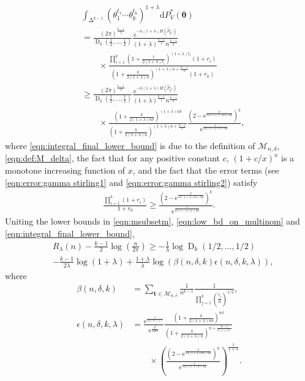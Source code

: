 \documentclass[journal, 10pt]{IEEEtran}
\newcommand{\rmd}{\mathrm{d}}
\newcommand{\rme}{\mathrm{e}}
\newcommand{\cM}{\mathcal{M}}
\theoremstyle{plain}
\theoremstyle{plain}
\theoremstyle{plain}
\theoremstyle{plain}
\newcommand{\boldtheta}{\mathbold{\theta}}
\newcommand{\boldt}{\mathbold{t}}
\newcommand{\opD}{\operatorname{D}}
\newcommand{\simplex}{\operatorname{\Delta}}
\begin{document}
\begin{align}
&\int_{\simplex^{k-1}}\left(\theta_1^{t_1}\cdots\theta_k^{t_k}\right)^{1+\lambda}\rmd P^*_{V}(\boldtheta) \nonumber \\
&=\frac{(2\pi)^{\frac{k-1}{2}}}{\opD_k(\frac12, \hdots, \frac12)} 
\frac{\rme^{-n(1+\lambda)H(\widehat{P}_{y ^n})}}{(1+\lambda)^{\frac{k-1}{2}}n^{\frac{k-1}{2}}}  \label{eqn:integral_term_by_term} \\
&\qquad  \times \frac{\prod_{i=1}^k\left(1+\frac{1}{2(1+\lambda)t_i}\right)^{(1+\lambda)t_i}(1+r_i)}{\left(1+\frac{k}{2(1+\lambda)n}\right)^{(1+\lambda)n+\frac{k-1}{2}}(1+r_0)}  \nonumber \\
&\geq \frac{(2\pi)^{\frac{k-1}{2}}}{\opD_k(\frac12, \hdots, \frac12)} 
\frac{\rme^{-n(1+\lambda)H(\widehat{P}_{y ^n})}}{(1+\lambda)^{\frac{k-1}{2}}n^{\frac{k-1}{2}}}  \label{eqn:integral_final_lower_bound}\\ 
&\qquad \times \frac{ \left(1+\frac{k}{2(1+\lambda)n\delta}\right)^{(1+\lambda)n\delta }}{\left(1+\frac{k}{2(1+\lambda)n}\right)^{(1+\lambda)n+\frac{k-1}{2}}} 
 \frac{\left(2-\rme^{\frac{k}{12(1+\lambda)n\delta+6k}}\right)^k}{\rme^{\frac{1}{12(1+\lambda)n+6k}}}\text{,} \nonumber
\end{align}
where \eqref{eqn:integral_final_lower_bound} is due to the definition of $\cM_{n, \delta}$, \eqref{eqn:def:M_delta}, the fact that for any positive constant $c$, $(1+{c}/{x})^x$ is a monotone increasing function of $x$, and the fact that the error terms (see \eqref{eqn:error:gamma stirling1} and \eqref{eqn:error:gamma stirling2}) satisfy
\begin{align}
\frac{\prod_{i=1}^k(1+r_i)}{1+r_0}\geq \frac{\left(2-\rme^{\frac{k}{12(1+\lambda)n\delta+6k}}\right)^k}{\rme^{\frac{1}{12(1+\lambda)n+6k}}}\text{.} \label{eqn:stirling_error_lower_bnd}
\end{align}
Uniting the lower bounds in \eqref{eqn:msubsetm}, \eqref{eqn:low_bd_on_multinom} and \eqref{eqn:integral_final_lower_bound}, 
\begin{align}
&R_\lambda(n) -\frac{k-1}{2}\log\left(\frac{n}{2\pi}\right)
\geq-\frac{1}{\lambda}\log\opD_k(1/2, \hdots, 1/2)
\label{eqn:renyi-redundancy-conv-pf-final-1} \\
& 
-\frac{k-1}{2\lambda} \log(1+\lambda)+ \frac{1+\lambda}{\lambda}\log(\beta(n,\delta, k)\epsilon(n, \delta, k, \lambda))
\text{,}  \nonumber 
\end{align}
where
\begin{align}
\beta(n,\delta, k)&=\sum_{\boldt \in\cM_{n, \delta} }
\frac{1}{n^{k-1}} \frac{1}{\prod_{j=1}^k \left(\frac{t_j}{n}\right)^{1/2}}\text{,} \label{def:beta}\\
\epsilon(n, \delta, k, \lambda)&=
 \frac{\rme^{\frac{1}{12(n+1)}}}{ \rme^{\frac{k^2}{12n\delta}}}
\frac{ \left(1+\frac{k}{2(1+\lambda)n\delta}\right)^{n\delta }}{ \left(1+\frac{k}{2(1+\lambda)n}\right)^{n+\frac{k-1}{2(1+\lambda)}}} \label{def:epsilon} \\
&\qquad \times \left(\frac{\left(2-\rme^{\frac{k}{12(1+\lambda)n\delta+6k}}\right)^k}{\rme^{\frac{1}{12(1+\lambda)n+6k}}}\right)^{\frac{1}{1+\lambda}}\text{.} \nonumber
\end{align}
\end{document}
